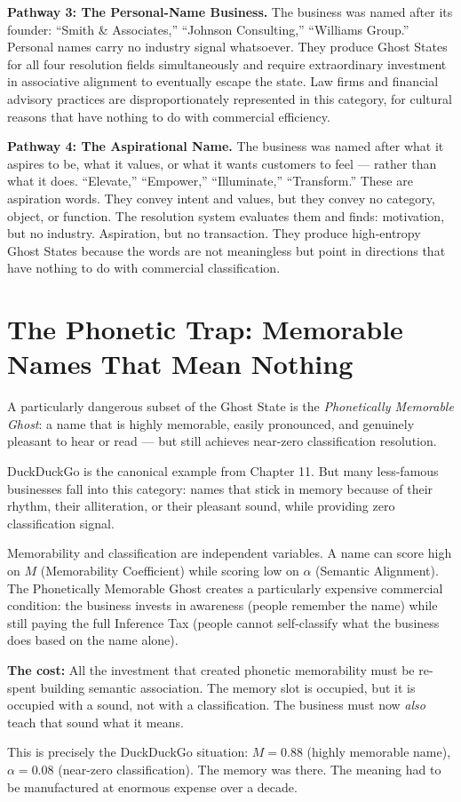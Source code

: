 \documentclass[12pt, openany]{book}
\theoremstyle{thmstyle}
\theoremstyle{defstyle}
\begin{document}
\textbf{Pathway 3: The Personal-Name Business.}
The business was named after its founder: ``Smith \& Associates,'' ``Johnson Consulting,'' ``Williams Group.'' Personal names carry no industry signal whatsoever. They produce Ghost States for all four resolution fields simultaneously and require extraordinary investment in associative alignment to eventually escape the state. Law firms and financial advisory practices are disproportionately represented in this category, for cultural reasons that have nothing to do with commercial efficiency.

\textbf{Pathway 4: The Aspirational Name.}
The business was named after what it aspires to be, what it values, or what it wants customers to feel --- rather than what it does. ``Elevate,'' ``Empower,'' ``Illuminate,'' ``Transform.'' These are aspiration words. They convey intent and values, but they convey no category, object, or function. The resolution system evaluates them and finds: motivation, but no industry. Aspiration, but no transaction. They produce high-entropy Ghost States because the words are not meaningless but point in directions that have nothing to do with commercial classification.

\section{The Phonetic Trap: Memorable Names That Mean Nothing}

A particularly dangerous subset of the Ghost State is the \textit{Phonetically Memorable Ghost}: a name that is highly memorable, easily pronounced, and genuinely pleasant to hear or read --- but still achieves near-zero classification resolution.

DuckDuckGo is the canonical example from Chapter 11. But many less-famous businesses fall into this category: names that stick in memory because of their rhythm, their alliteration, or their pleasant sound, while providing zero classification signal.

\begin{warnbox}
Memorability and classification are independent variables. A name can score high on $M$ (Memorability Coefficient) while scoring low on $\alpha$ (Semantic Alignment). The Phonetically Memorable Ghost creates a particularly expensive commercial condition: the business invests in awareness (people remember the name) while still paying the full Inference Tax (people cannot self-classify what the business does based on the name alone).

\textbf{The cost:} All the investment that created phonetic memorability must be re-spent building semantic association. The memory slot is occupied, but it is occupied with a sound, not with a classification. The business must now \textit{also} teach that sound what it means.

This is precisely the DuckDuckGo situation: $M = 0.88$ (highly memorable name), $\alpha = 0.08$ (near-zero classification). The memory was there. The meaning had to be manufactured at enormous expense over a decade.
\end{warnbox}
\end{document}
